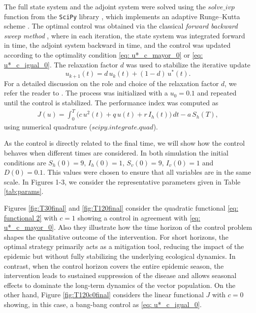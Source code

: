 \documentclass{amsart}
\theoremstyle{definition}
\theoremstyle{remark}
\numberwithin{equation}{section}
\begin{document}
The full state system and the adjoint system were solved using the \texttt{$solve\_ivp$} function from the \texttt{SciPy} library \cite{Virtanen2020}, which implements an adaptive Runge–Kutta scheme \cite{DormandPrince1980}.
The optimal control was obtained via the classical \emph{forward backward sweep method} \cite{mcasey2012}, where in each iteration, the state system was integrated forward in time, the adjoint system backward in time, and the control was updated according to the optimality condition
\eqref{eq: u*_c_mayor_0} or \eqref{eq: u*_c_igual_0}.
The relaxation factor $d$ was used to stabilize the iterative update
$$
u_{k+1}(t) = d\,u_k(t) + (1-d)\,u^*(t).
$$
For a detailed discussion on the role and choice of the relaxation factor $d$, we refer the reader to \cite{Sharp2021}.
The process was initialized with a $u_0=0.1$ and repeated until the control is stabilized.
The performance index was computed as
\begin{align} \label{eq: functional 2}
J(u) = \int_0^T \!\!\big(c\,u^2(t) + q\,u(t) + r\,I_h(t)\big)\,dt - a\,S_h(T),
\end{align}
using numerical quadrature (\texttt{$scipy.integrate.quad$}).

As the control is directly related to the final time, we will show how the control behaves when different times are considered. In both simulation the initial conditions are $S_h(0)=9$, $I_h(0)=1$, $S_v(0)=9$, $I_v(0)=1$ and $D(0)=0.1$. This values were chosen to ensure that all variables are in the same scale. In Figures 1-3, we consider the representative parameters given in Table \ref{tab:params}.

Figures \ref{fig:T30final} and \ref{fig:T120final} consider the quadratic functional \eqref{eq: functional 2} with $c=1$ showing a control in agreement with \eqref{eq: u*_c_mayor_0}. Also they illustrate how the time horizon of the control problem shapes the qualitative outcome of the intervention.
For short horizons, the optimal strategy primarily acts as a mitigation tool, reducing the impact of the epidemic but without fully stabilizing the underlying ecological dynamics.
In contrast, when the control horizon covers the entire epidemic season, the intervention leads to sustained suppression of the disease and allows seasonal effects to dominate the long-term dynamics of the vector population.
On the other hand, Figure \ref{fig:T120c0final} considers the linear functional $J$ with $c=0$ showing, in this case, a bang-bang control as \eqref{eq: u*_c_igual_0}.
\end{document}
